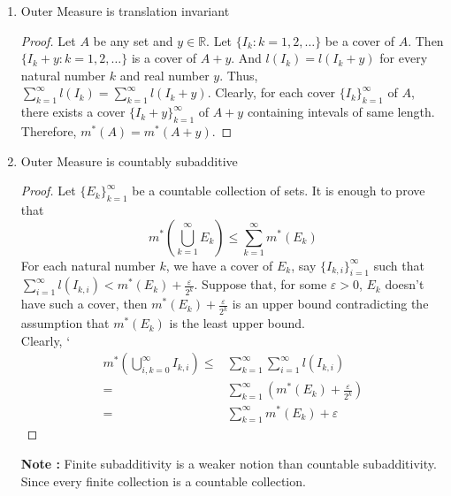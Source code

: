 \begin{enumerate}
\begin{proof}
	By monotonicity of Lebesgue outer measure, we have $m^\ast(J_1) \le m^\ast(I) \le m^\ast(J_2)$.
	However $m^\ast(J_1) = l(I)-\varepsilon$ and $m^\ast(J_2) = l(I)+\varepsilon$.
	Thus, $l(I)-\varepsilon \le m^\ast(I) \le l(I)+\varepsilon$.
	Therefore, $m^\ast(I) = l(I)$.

	\textbf{Case 3 : Unbounded Interval}
	Let $I$ be an unbounded interval.
	Then for any natural number $n$, there exists a closed bounded interval $J$ such that $J \subset I$ and $l(J) = n$.
	And $n = m^\ast(J) \le m^\ast(I),\ \forall n \in \mathbb{N}$.
	Therefore, $m^\ast(I) = \infty = l(I)$. 
	\end{proof}
	\item Outer Measure is translation invariant
	\begin{proof}
	Let $A$ be any set and $y \in \mathbb{R}$.
	Let $\{ I_k : k = 1,2,\dots \}$ be a cover of $A$.
	Then $\{ I_k+y : k = 1,2,\dots \}$ is a cover of $A+y$.
	And $l(I_k) = l(I_k+y)$ for every natural number $k$ and real number $y$.
	Thus, $\displaystyle \sum_{k=1}^\infty l(I_k) = \sum_{k=1}^\infty l(I_k+y)$.
	Clearly, for each cover $\{I_k\}_{k=1}^\infty$ of $A$, there exists a cover $\{ I_k+y \}_{k=1}^\infty$ of $A+y$ containing intevals of same length.
	Therefore, $m^\ast(A) = m^\ast(A+y)$.
	\end{proof}
	\item Outer Measure is countably subadditive
	\begin{proof}
	Let $\{E_k\}_{k=1}^\infty$ be a countable collection of sets.
	It is enough to prove that
		\begin{equation}
			m^\ast \left( \bigcup_{k=1}^\infty E_k \right) \le \sum_{k=1}^\infty m^\ast(E_k)
		\end{equation}
		For each natural number $k$, we have a cover of $E_k$, say $\{ I_{k,i} \}_{i = 1}^\infty$ such that $\displaystyle \sum_{i=1}^\infty l(I_{k,i}) < m^\ast(E_k) + \frac{\varepsilon}{2^k}$.
		Suppose that, for some $\varepsilon > 0$, $E_k$ doesn't have such a cover, then $m^\ast(E_k) + \frac{\varepsilon}{2^k}$ is an upper bound contradicting the assumption that $m^\ast(E_k)$ is the least upper bound.\\

	Clearly,
`	\begin{align*}
	m^\ast \left( \bigcup_{i,k = 0}^\infty I_{k,i} \right)
	\le & \sum_{k=1}^\infty \sum_{i=1}^\infty l(I_{k,i}) \\
	= & \sum_{k=1}^\infty \left( m^\ast(E_k) + \frac{\varepsilon}{2^k} \right) \\
	= & \sum_{k=1}^\infty  m^\ast(E_k) + \varepsilon
	\end{align*}
\end{proof}
	\textbf{Note : } Finite subadditivity is a weaker notion than countable subadditivity.
	Since every finite collection is a countable collection.
\end{enumerate}

